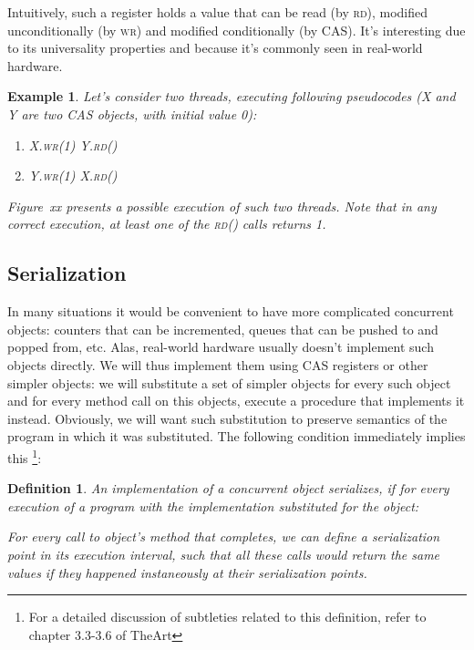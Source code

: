 \documentclass[a4paper,11pt]{article}
\newtheorem{example}{Example}
\newtheorem{definition}{Definition}
\newcommand{\fn}[1]{\textsc{#1}}
\begin{document}
Intuitively, such a register holds a value that can be read (by \fn{rd}), modified unconditionally (by \fn{wr})
and modified conditionally (by \fn{CAS}). It's interesting due to its universality properties and because it's
commonly seen in real-world hardware. %

\begin{example}
Let's consider two threads, executing following pseudocodes (X and Y are two CAS objects, with initial value 0):

\begin{enumerate}
\item\begin{algorithmic}[1]
\State X.\fn{wr}(1)
\State Y.\fn{rd}()
\end{algorithmic}

\item\begin{algorithmic}[1]
\State Y.\fn{wr}(1)
\State X.\fn{rd}()
\end{algorithmic}
\end{enumerate}

Figure~xx presents a possible execution of such two threads. Note that in any correct execution,
at least one of the \fn{rd}() calls returns 1.
\end{example}

\subsection{Serialization}
In many situations it would be convenient to have more complicated concurrent objects: counters that can be incremented,
queues that can be pushed to and popped from, etc. Alas, real-world hardware usually doesn't implement such objects
directly. We will thus implement them using CAS registers or other simpler objects: we will substitute a set of simpler objects for every such object and for every method call on this objects, execute a procedure that implements it instead. Obviously, we will want such substitution to preserve semantics of the program in which it was substituted. The following condition immediately implies this
\footnote{For a detailed discussion of subtleties related to this definition, refer to chapter 3.3-3.6 of TheArt}:

\begin{definition}
An implementation of a concurrent object \emph{serializes}, if for every execution of a program with the implementation
substituted for the object:

For every call to object's method that completes, we can define a \emph{serialization point} in its execution
interval, such that all these calls would return the same values if they happened instaneously at their serialization
points.
\end{definition}
\end{document}
